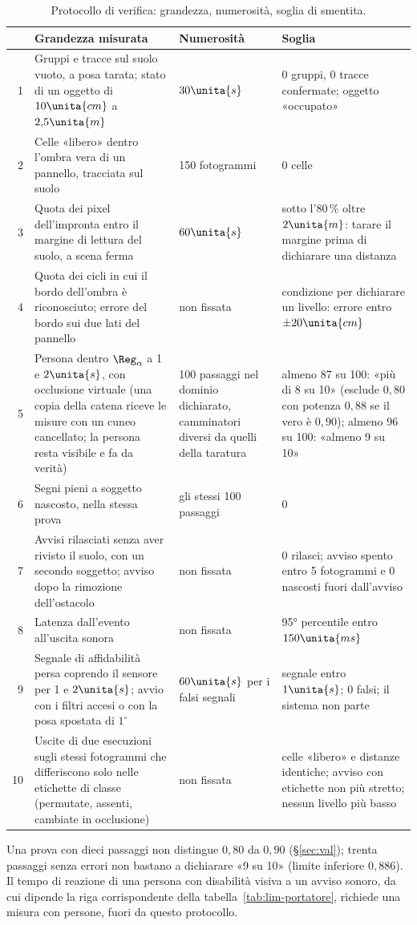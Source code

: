 \begin{table}[H]\centering\footnotesize
\caption{Protocollo di verifica: grandezza, numerosità, soglia di smentita.}\label{tab:lim-misure}
\begin{tabularx}{\linewidth}{@{}rLp{4.0cm}p{4.6cm}@{}}
\toprule
 & Grandezza misurata & Numerosità & Soglia\\
 & Gruppi e tracce sul suolo vuoto, a posa tarata; stato di un oggetto di $10\unita{cm}$ a $2{,}5\unita{m}$ & $30\unita{s}$ & 0 gruppi, 0 tracce confermate; oggetto «occupato»\\
2 & Celle «libero» dentro l'ombra vera di un pannello, tracciata sul suolo & 150 fotogrammi & 0 celle\\
3 & Quota dei pixel dell'impronta entro il margine di lettura del suolo, a scena ferma & $60\unita{s}$ & sotto l'$80\,\%$ oltre $2\unita{m}$: tarare il margine prima di dichiarare una distanza\\
4 & Quota dei cicli in cui il bordo dell'ombra è riconosciuto; errore del bordo sui due lati del pannello & non fissata & condizione per dichiarare un livello: errore entro $\pm20\unita{cm}$\\
5 & Persona dentro $\Reg_\alpha$ a 1 e $2\unita{s}$, con occlusione virtuale (una copia della catena riceve le misure con un cuneo cancellato; la persona resta visibile e fa da verità) & 100 passaggi nel dominio dichiarato, camminatori diversi da quelli della taratura & almeno 87 su 100: «più di 8 su 10» (esclude $0{,}80$ con potenza $0{,}88$ se il vero è $0{,}90$); almeno 96 su 100: «almeno 9 su 10»\\
6 & Segni pieni a soggetto nascosto, nella stessa prova & gli stessi 100 passaggi & 0\\
7 & Avvisi rilasciati senza aver rivisto il suolo, con un secondo soggetto; avviso dopo la rimozione dell'ostacolo & non fissata & 0 rilasci; avviso spento entro 5 fotogrammi e 0 nascosti fuori dall'avviso\\
8 & Latenza dall'evento all'uscita sonora & non fissata & 95° percentile entro $150\unita{ms}$\\
9 & Segnale di affidabilità persa coprendo il sensore per 1 e $2\unita{s}$; avvio con i filtri accesi o con la posa spostata di $1^\circ$ & $60\unita{s}$ per i falsi segnali & segnale entro $1\unita{s}$; 0 falsi; il sistema non parte\\
10 & Uscite di due esecuzioni sugli stessi fotogrammi che differiscono solo nelle etichette di classe (permutate, assenti, cambiate in occlusione) & non fissata & celle «libero» e distanze identiche; avviso con etichette non più stretto; nessun livello più basso\\
\bottomrule
\end{tabularx}
\end{table}

Una prova con dieci passaggi non distingue $0{,}80$ da $0{,}90$ (\S\ref{sec:val}); trenta passaggi senza errori non bastano a dichiarare «9 su 10» (limite inferiore $0{,}886$). Il tempo di reazione di una persona con disabilità visiva a un avviso sonoro, da cui dipende la riga corrispondente della tabella~\ref{tab:lim-portatore}, richiede una misura con persone, fuori da questo protocollo.

